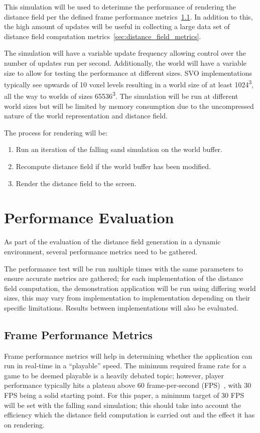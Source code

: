 This simulation will be used to deterimne the performance of rendering the distance field per the defined frame
performance metrics~\ref{sec:frame_perf_metrics}. In addition to this, the high amount of updates will be useful in
collecting a large data set of distance field computation metrics~\ref{sec:distance_field_metrics}.

The simulation will have a variable update frequency allowing control over the number of updates run per second.
Additionally, the world will have a variable size to allow for testing the performance at different sizes. SVO
implementations typically see upwards of 10 voxel levels resulting in a world size of at least 1024\textsuperscript{3},
all the way to worlds of sizes 65536\textsuperscript{3}. The simulation will be run at different world sizes but will
be limited by memory consumption due to the uncompressed nature of the world representation and distance field.

The process for rendering will be:

\begin{enumerate}
    \item Run an iteration of the falling sand simulation on the world buffer.
    \item Recompute distance field if the world buffer has been modified.
    \item Render the distance field to the screen.
\end{enumerate}

\section{Performance Evaluation}
As part of the evaluation of the distance field generation in a dynamic environment, several performance metrics need to
be gathered.

The performance test will be run multiple times with the same parameters to ensure accurate metrics are gathered; for
each implementation of the distance field computation, the demonstration application will be run using differing world
sizes, this may vary from implementation to implementation depending on their specific limitations. Results between
implementations will also be evaluated.

\subsection{Frame Performance Metrics}\label{sec:frame_perf_metrics}
Frame performance metrics will help in determining whether the application can run in real-time in a ``playable'' speed.
The minimum required frame rate for a game to be deemed playable is a heavily debated topic; however, player performance
typically hits a plateau above 60 frame-per-second (FPS)~\cite{claypool2007frame}, with 30 FPS being a solid starting
point. For this paper, a minimum target of 30 FPS will be set with the falling sand simulation; this should take into
account the efficiency which the distance field computation is carried out and the effect it has on rendering.

